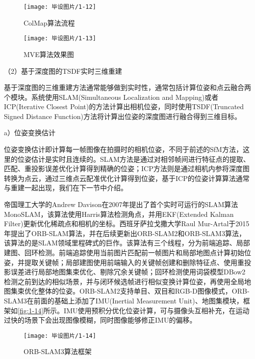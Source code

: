 \begin{figure}[htbp]
    \centering
    \texttt{[image: 毕设图片/1-12]}
    \caption{\label{fig:1-12}ColMap算法流程\cite{schoenberger2016sfm}\cite{schoenberger2016mvs}}
\end{figure}

\begin{figure}[htbp]
    \centering
    \texttt{[image: 毕设图片/1-13]}
    \caption{\label{fig:1-13}MVE算法效果图\cite{Fuhrmann}}
\end{figure}

（2）基于深度图的TSDF实时三维重建

基于深度图的三维重建方法通常能够做到实时性，通常包括计算位姿和点云融合两个模块。系统使用SLAM(Simultaneous Localization and Mapping)或者ICP(Iterative Closest Point)\cite{ICP}的方法计算出相机位姿，同时使用TSDF(Truncated Signed Distance Function)\cite{KinectFusion}方法将计算出位姿的深度图进行融合得到三维目标。

a）位姿变换估计

位姿变换估计即计算每一帧图像在拍摄时的相机位姿，不同于前述的SfM方法，这里的位姿估计是实时且连续的。SLAM方法是通过对相邻帧间进行特征点的提取、匹配、重投影误差优化计算得到精确的位姿；ICP方法则是通过相机内参将深度图转换为点云，通过三维点云配准优化计算得到位姿，基于ICP的位姿计算算法通常与重建一起出现，我们在下一节中介绍。

帝国理工大学的Andrew Davison在2007年提出了首个实时可运行的SLAM算法MonoSLAM\cite{MonoSLAM}，该算法使用Harris算法检测角点，并用EKF(Extended Kalman Filter)\cite{EKF}更新优化稀疏点和相机的坐标。西班牙萨拉戈撒大学Raul Mur-Artal于2015年提出了ORB-SLAM\cite{ORBSLAM}算法，并在后续更新出ORB-SLAM2\cite{ORBSLAM2}和ORB-SLAM3\cite{ORBSLAM3}算法，该算法的是SLAM领域里程碑式的巨作。该算法有三个线程，分为前端追踪、局部建图、回环检测。前端追踪使用当前图片匹配前一帧图片和局部地图点计算初始位姿，并提取关键帧；局部建图使用前端输入的关键帧创建和删除特征点、使用重投影误差进行局部地图集束优化、剔除冗余关键帧；回环检测使用词袋模型DBow2\cite{DBow2}检测之前到达的相似场景，并与闭环候选帧进行相似变换计算位姿，再使用全局地图集束优化整体的位姿。ORB-SLAM2支持单目、双目和RGB-D图像模式，ORB-SLAM3在前面的基础上添加了IMU(Inertial Measurement Unit)、地图集模块，框架如\autoref{fig:1-14}所示。IMU使用预积分优化位姿计算，可与摄像头互相补充，在运动过快的场景下会出现图像模糊，同时图像能够修正IMU的偏移。

\begin{figure}[htbp]
    \centering
    \texttt{[image: 毕设图片/1-14]}
    \caption{\label{fig:1-14}ORB-SLAM3算法框架\cite{ORBSLAM3}}
\end{figure}

